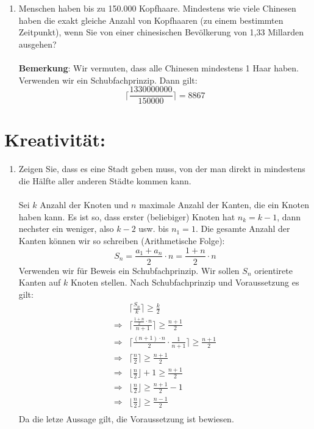 \begin{enumerate}[label=(\alph*)]
        \item Menschen haben bis zu 150.000 Kopfhaare. Mindestens wie viele Chinesen haben die
		exakt gleiche Anzahl von Kopfhaaren (zu einem bestimmten Zeitpunkt), wenn Sie von
		einer chinesischen Bevölkerung von 1,33 Millarden ausgehen?\\\\
		\textbf{Bemerkung}: Wir vermuten, dass alle Chinesen mindestens 1 Haar haben.\\
		Verwenden wir ein Schubfachprinzip. Dann gilt:
		\[\bigg\lceil\frac{1330000000}{150000}\bigg\rceil = 8867\]
    \end{enumerate}
    \section*{Kreativit\"at:}
    \begin{enumerate}[label=(\alph*)]
    	\item Zeigen Sie, dass es eine Stadt geben muss, von der man direkt in mindestens die Hälfte
		aller anderen Städte kommen kann.\\\\
		Sei $k$ Anzahl der Knoten und $n$ maximale Anzahl der Kanten, die ein Knoten haben kann. 
		Es ist so, dass erster (beliebiger) Knoten hat $n_k = k-1$, dann nechster ein weniger, 
		also $k-2$ usw. bis $n_1 = 1$. 
		Die gesamte Anzahl der Kanten k\"onnen wir so schreiben (Arithmetische Folge): 
		\[S_n = \frac{a_1+a_n}{2}\cdot n = \frac{1+n}{2}\cdot n\]
		Verwenden wir f\"ur Beweis ein Schubfachprinzip. Wir sollen $S_n$ orientirete Kanten auf $k$ 
		Knoten stellen. Nach Schubfachprinzip und Voraussetzung es gilt: 
		\begin{align*}
			&\bigg\lceil\frac{S_n}{k}\bigg\rceil \geq \frac{k}{2} \\
			\Rightarrow &\bigg\lceil\frac{\frac{1+n}{2}\cdot n}{n+1}\bigg\rceil \geq \frac{n+1}{2}\\
			\Rightarrow &\bigg\lceil\frac{(n+1)\cdot n}{2} \cdot \frac{1}{n+1}\bigg\rceil \geq \frac{n+1}{2}\\
			\Rightarrow &\bigg\lceil\frac{n}{2}\bigg\rceil \geq \frac{n+1}{2}\\
			\Rightarrow &\bigg\lfloor\frac{n}{2}\bigg\rfloor + 1 \geq \frac{n+1}{2}\\
			\Rightarrow &\bigg\lfloor\frac{n}{2}\bigg\rfloor \geq \frac{n+1}{2} - 1\\
			\Rightarrow &\bigg\lfloor\frac{n}{2}\bigg\rfloor \geq \frac{n-1}{2}\\
		\end{align*}
		Da die letze Aussage gilt, die Voraussetzung ist bewiesen.
    \end{enumerate}







